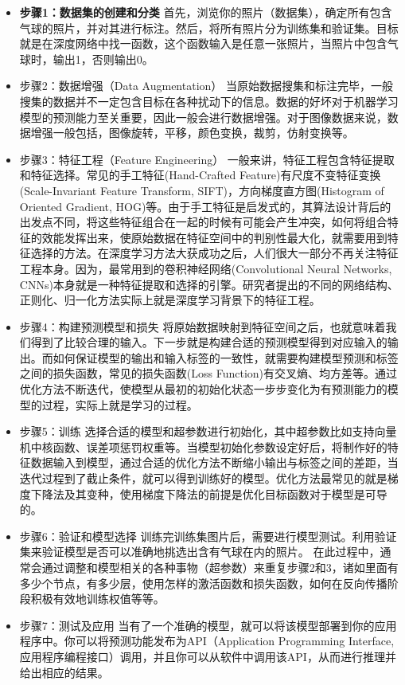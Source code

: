\begin{itemize}
	\itemsep0em 
	\item {\bf 步骤1：数据集的创建和分类} 首先，浏览你的照片（数据集），确定所有包含气球的照片，并对其进行标注。然后，将所有照片分为训练集和验证集。目标就是在深度网络中找一函数，这个函数输入是任意一张照片，当照片中包含气球时，输出1，否则输出0。

\item 步骤2：数据增强（Data Augmentation）
	当原始数据搜集和标注完毕，一般搜集的数据并不一定包含目标在各种扰动下的信息。数据的好坏对于机器学习模型的预测能力至关重要，因此一般会进行数据增强。对于图像数据来说，数据增强一般包括，图像旋转，平移，颜色变换，裁剪，仿射变换等。

\item 步骤3：特征工程（Feature Engineering）
	一般来讲，特征工程包含特征提取和特征选择。常见的手工特征(Hand-Crafted Feature)有尺度不变特征变换(Scale-Invariant Feature Transform, SIFT)，方向梯度直方图(Histogram of Oriented Gradient, HOG)等。由于手工特征是启发式的，其算法设计背后的出发点不同，将这些特征组合在一起的时候有可能会产生冲突，如何将组合特征的效能发挥出来，使原始数据在特征空间中的判别性最大化，就需要用到特征选择的方法。在深度学习方法大获成功之后，人们很大一部分不再关注特征工程本身。因为，最常用到的卷积神经网络(Convolutional Neural Networks, CNNs)本身就是一种特征提取和选择的引擎。研究者提出的不同的网络结构、正则化、归一化方法实际上就是深度学习背景下的特征工程。

\item 步骤4：构建预测模型和损失
	将原始数据映射到特征空间之后，也就意味着我们得到了比较合理的输入。下一步就是构建合适的预测模型得到对应输入的输出。而如何保证模型的输出和输入标签的一致性，就需要构建模型预测和标签之间的损失函数，常见的损失函数(Loss Function)有交叉熵、均方差等。通过优化方法不断迭代，使模型从最初的初始化状态一步步变化为有预测能力的模型的过程，实际上就是学习的过程。

\item 步骤5：训练
	选择合适的模型和超参数进行初始化，其中超参数比如支持向量机中核函数、误差项惩罚权重等。当模型初始化参数设定好后，将制作好的特征数据输入到模型，通过合适的优化方法不断缩小输出与标签之间的差距，当迭代过程到了截止条件，就可以得到训练好的模型。优化方法最常见的就是梯度下降法及其变种，使用梯度下降法的前提是优化目标函数对于模型是可导的。

\item 步骤6：验证和模型选择
	训练完训练集图片后，需要进行模型测试。利用验证集来验证模型是否可以准确地挑选出含有气球在内的照片。
	在此过程中，通常会通过调整和模型相关的各种事物（超参数）来重复步骤2和3，诸如里面有多少个节点，有多少层，使用怎样的激活函数和损失函数，如何在反向传播阶段积极有效地训练权值等等。

\item 步骤7：测试及应用
	当有了一个准确的模型，就可以将该模型部署到你的应用程序中。你可以将预测功能发布为API（Application Programming Interface, 应用程序编程接口）调用，并且你可以从软件中调用该API，从而进行推理并给出相应的结果。
	\end{itemize}

